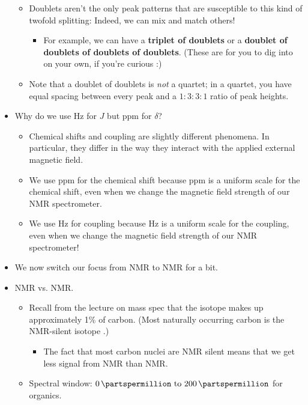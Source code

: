 \documentclass[../notes.tex]{subfiles}
\begin{document}
\begin{itemize}
\begin{itemize}
\begin{itemize}
        \end{itemize}
        \item Doublets aren't the only peak patterns that are susceptible to this kind of twofold splitting: Indeed, we can mix and match others!
        \begin{itemize}
            \item For example, we can have a \textbf{triplet of doublets} or a \textbf{doublet of doublets of doublets of doublets}. (These are for you to dig into on your own, if you're curious :)
        \end{itemize}
        \item Note that a doublet of doublets is \emph{not} a quartet; in a quartet, you have equal spacing between every peak and a $1:3:3:1$ ratio of peak heights.
    \end{itemize}
    \item Why do we use Hz for $J$ but ppm for $\delta$?
    \begin{itemize}
        \item Chemical shifts and coupling are slightly different phenomena. In particular, they differ in the way they interact with the applied external magnetic field.
        \item We use ppm for the chemical shift because ppm is a uniform scale for the chemical shift, even when we change the magnetic field strength of our NMR spectrometer.
        \item We use Hz for coupling because Hz is a uniform scale for the coupling, even when we change the magnetic field strength of our NMR spectrometer!
    \end{itemize}
    \item We now switch our focus from  NMR to  NMR for a bit.
    \item {} NMR vs.  NMR.
    \begin{itemize}
        \item Recall from the lecture on mass spec that the  isotope makes up approximately 1\% of carbon. (Most naturally occurring carbon is the NMR-silent isotope .)
        \begin{itemize}
            \item The fact that most carbon nuclei are NMR silent means that we get less signal from  NMR than  NMR.
        \end{itemize}
        \item Spectral window: $\SIrange{0}{200}{\partspermillion}$ for organics.

\end{itemize}
\end{itemize}
\end{document}
